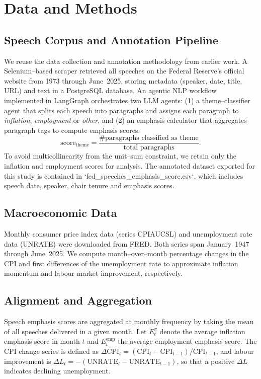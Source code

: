 \documentclass[sigconf]{acmart}
\begin{document}
\section{Data and Methods}

\subsection{Speech Corpus and Annotation Pipeline}
We reuse the data collection and annotation methodology from earlier work.  A Selenium–based scraper retrieved all speeches on the Federal Reserve’s official website from 1973 through June 2025, storing metadata (speaker, date, title, URL) and text in a PostgreSQL database.  An agentic NLP workflow implemented in LangGraph orchestrates two LLM agents: (1) a theme–classifier agent that splits each speech into paragraphs and assigns each paragraph to \textit{inflation}, \textit{employment} or \textit{other}, and (2) an emphasis calculator that aggregates paragraph tags to compute emphasis scores:
\begin{equation}
  \mathrm{score}_{\mathrm{theme}} = \frac{\text{\# paragraphs classified as theme}}{\text{total paragraphs}}.
\end{equation}
To avoid multicollinearity from the unit–sum constraint, we retain only the inflation and employment scores for analysis.  The annotated dataset exported for this study is contained in `fed\_speeches\_emphasis\_score.csv`, which includes speech date, speaker, chair tenure and emphasis scores.

\subsection{Macroeconomic Data}
Monthly consumer price index data (series CPIAUCSL) and unemployment rate data (UNRATE) were downloaded from FRED.  Both series span January 1947 through June 2025.  We compute month–over–month percentage changes in the CPI and first differences of the unemployment rate to approximate inflation momentum and labour market improvement, respectively.

\subsection{Alignment and Aggregation}
Speech emphasis scores are aggregated at monthly frequency by taking the mean of all speeches delivered in a given month.  Let \(E_{t}^{\pi}\) denote the average inflation emphasis score in month \(t\) and \(E_{t}^{\mathrm{emp}}\) the average employment emphasis score.  The CPI change series is defined as \(\Delta \mathrm{CPI}_{t} = (\mathrm{CPI}_{t} - \mathrm{CPI}_{t-1}) / \mathrm{CPI}_{t-1}\), and labour improvement is \(\Delta L_{t} = -(\mathrm{UNRATE}_{t} - \mathrm{UNRATE}_{t-1})\), so that a positive \(\Delta L\) indicates declining unemployment.
\end{document}
